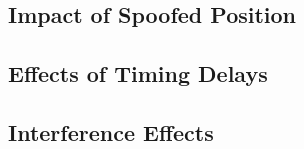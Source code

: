     \subsection{Impact of Spoofed Position}
        


    \subsection{Effects of Timing Delays}
    


    \subsection{Interference Effects}
    

